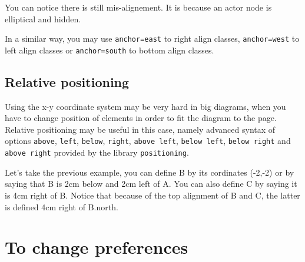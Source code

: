 \documentclass[a4paper,11pt]{report}
\begin{document}
\begin{minipage}{0.5\textwidth}
	
\end{minipage}
\begin{minipage}{0.5\textwidth}
	\begin{center}
	\end{center}
\end{minipage}

\medskip

You can notice there is still mis-alignement. It is because an actor node is elliptical and hidden.

\medskip

In a similar way, you may use {\tt anchor=east} to right align classes, {\tt anchor=west} to left align classes or {\tt anchor=south} to bottom align classes.

\subsection{Relative positioning}\label{ss.ucdiagrelpos}

Using the x-y coordinate system may be very hard in big diagrams, when you have to change position of elements in order to fit the diagram to the page. Relative positioning may be useful in this case, namely advanced syntax of options {\tt above}, {\tt left}, {\tt below}, {\tt right}, {\tt above left}, {\tt below left}, {\tt below right} and {\tt above right} provided by the \TikZ library {\tt positioning}.

\medskip

Let's take the previous example, you can define B by its cordinates (-2,-2) or by saying that B is 2cm below and 2cm left of A. You can also define C by saying it is 4cm right of B. Notice that because of the top alignment of B and C, the latter is defined 4cm right of B.north.

\medskip

\begin{minipage}{0.5\textwidth}
	
\end{minipage}
\begin{minipage}{0.5\textwidth}
	\begin{center}
	\end{center}
\end{minipage}

\medskip

\section{To change preferences}\label{s.fitusecase}
\end{document}
